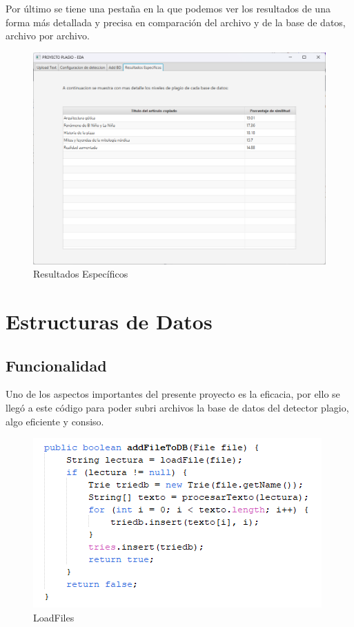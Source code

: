 \documentclass[a4paper]{article}
\begin{document}
\begin{multicols}{2}
Por último se tiene una pestaña en la que podemos ver los resultados de una forma más detallada y precisa en comparación del archivo y de la base de datos, archivo por archivo.

\begin{figure}[H]
    \centering
    \includegraphics[width=0.9\linewidth]{img/Espec.png}
    \caption{Resultados Específicos}
    \label{fig:enter-label}
\end{figure}

\section{Estructuras de Datos}
\subsection{Funcionalidad}
Uno de los aspectos importantes del presente proyecto es la eficacia, por ello se llegó a este código para poder subri archivos la base de datos del detector plagio, algo eficiente y consiso.
\begin{figure}[H]
    \centering
    \includegraphics[width=1\linewidth]{img/Load.png}
    \caption{LoadFiles}
    \label{fig:enter-label}
\end{figure}


\end{multicols}
\end{document}
